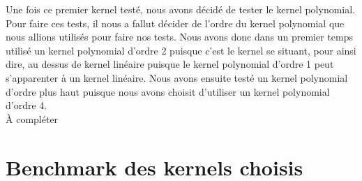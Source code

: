 \documentclass[fontsize=10pt, twoside=no]{scrartcl} %
\begin{document}
Une fois ce premier kernel testé, nous avons décidé de tester le kernel polynomial. Pour faire ces tests, il nous a fallut décider de l'ordre du kernel polynomial que nous allions utilisés pour faire nos tests. Nous avons donc dans un premier temps utilisé un kernel polynomial d'ordre 2 puisque c'est le kernel se situant, pour ainsi dire, au dessus de kernel linéaire puisque le kernel polynomial d'ordre 1 peut s'apparenter à un kernel linéaire. Nous avons ensuite testé un kernel polynomial d'ordre plus haut puisque nous avons choisit d'utiliser un kernel polynomial d'ordre 4.\\

\`A compléter

\part{Benchmark des kernels choisis}

\\
\end{document}
